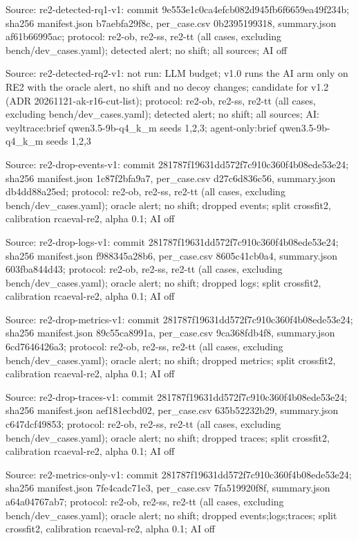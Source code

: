 \noindent Source: re2-detected-rq1-v1: commit 9e553e1c0ca4efcb082d945fb6f6659ea49f234b; sha256 manifest.json b7aebfa29f8c, per\_case.csv 0b2395199318, summary.json af61b66995ac; protocol: re2-ob, re2-ss, re2-tt (all cases, excluding bench/\allowbreak{}dev\_cases.yaml); detected alert; no shift; all sources; AI off\par
\noindent Source: re2-detected-rq2-v1: not run: LLM budget; v1.0 runs the AI arm only on RE2 with the oracle alert, no shift and no decoy changes; candidate for v1.2 (ADR 20261121-ak-r16-cut-list); protocol: re2-ob, re2-ss, re2-tt (all cases, excluding bench/\allowbreak{}dev\_cases.yaml); detected alert; no shift; all sources; AI: veyltrace:brief qwen3.5-9b-q4\_k\_m seeds 1,2,3; agent-only:brief qwen3.5-9b-q4\_k\_m seeds 1,2,3\par
\noindent Source: re2-drop-events-v1: commit 281787f19631dd572f7c910c360f4b08ede53e24; sha256 manifest.json 1c87f2bfa9a7, per\_case.csv d27c6d836c56, summary.json db4dd88a25ed; protocol: re2-ob, re2-ss, re2-tt (all cases, excluding bench/\allowbreak{}dev\_cases.yaml); oracle alert; no shift; dropped events; split crossfit2, calibration rcaeval-re2, alpha 0.1; AI off\par
\noindent Source: re2-drop-logs-v1: commit 281787f19631dd572f7c910c360f4b08ede53e24; sha256 manifest.json f988345a28b6, per\_case.csv 8605c41cb0a4, summary.json 603fba844d43; protocol: re2-ob, re2-ss, re2-tt (all cases, excluding bench/\allowbreak{}dev\_cases.yaml); oracle alert; no shift; dropped logs; split crossfit2, calibration rcaeval-re2, alpha 0.1; AI off\par
\noindent Source: re2-drop-metrics-v1: commit 281787f19631dd572f7c910c360f4b08ede53e24; sha256 manifest.json 89c55ca8991a, per\_case.csv 9ca368fdb4f8, summary.json 6cd7646426a3; protocol: re2-ob, re2-ss, re2-tt (all cases, excluding bench/\allowbreak{}dev\_cases.yaml); oracle alert; no shift; dropped metrics; split crossfit2, calibration rcaeval-re2, alpha 0.1; AI off\par
\noindent Source: re2-drop-traces-v1: commit 281787f19631dd572f7c910c360f4b08ede53e24; sha256 manifest.json aef181ecbd02, per\_case.csv 635b52232b29, summary.json c647dcf49853; protocol: re2-ob, re2-ss, re2-tt (all cases, excluding bench/\allowbreak{}dev\_cases.yaml); oracle alert; no shift; dropped traces; split crossfit2, calibration rcaeval-re2, alpha 0.1; AI off\par
\noindent Source: re2-metrics-only-v1: commit 281787f19631dd572f7c910c360f4b08ede53e24; sha256 manifest.json 7fe4cadc71e3, per\_case.csv 7fa519920f8f, summary.json a64a04767ab7; protocol: re2-ob, re2-ss, re2-tt (all cases, excluding bench/\allowbreak{}dev\_cases.yaml); oracle alert; no shift; dropped events;logs;traces; split crossfit2, calibration rcaeval-re2, alpha 0.1; AI off\par
